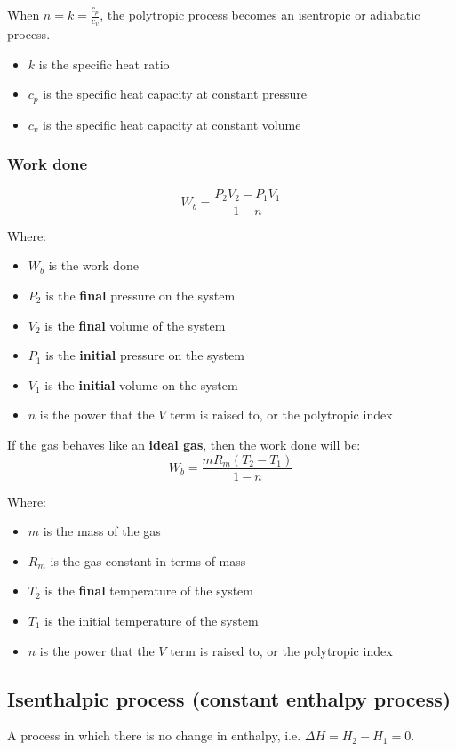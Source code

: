\documentclass[11pt]{article}
\begin{document}
When \(n = k = \frac{c_p}{c_v}\), the polytropic process becomes an isentropic or adiabatic process.
\begin{itemize}
\item \(k\) is the specific heat ratio
\item \(c_p\) is the specific heat capacity at constant pressure
\item \(c_v\) is the specific heat capacity at constant volume
\end{itemize}

\newpage

\subsubsection{Work done}
\label{sec:org0edfbde}
\[W_b = \frac{P_2 V_2 - P_1 V_1}{1 - n}\]

Where:
\begin{itemize}
\item \(W_b\) is the work done
\item \(P_2\) is the \textbf{final} pressure on the system
\item \(V_2\) is the \textbf{final} volume of the system
\item \(P_1\) is the \textbf{initial} pressure on the system
\item \(V_1\) is the \textbf{initial} volume on the system
\item \(n\) is the power that the \(V\) term is raised to, or the polytropic index
\end{itemize}

If the gas behaves like an \textbf{ideal gas}, then the work done will be:
\[W_b = \frac{m R_m (T_2 - T_1)}{1 - n}\]

Where:
\begin{itemize}
\item \(m\) is the mass of the gas
\item \(R_m\) is the gas constant in terms of mass
\item \(T_2\) is the \textbf{final} temperature of the system
\item \(T_1\) is the initial temperature of the system
\item \(n\) is the power that the \(V\) term is raised to, or the polytropic index
\end{itemize}

\subsection{Isenthalpic process (constant enthalpy process)}
\label{sec:orgaf4fb43}
A process in which there is no change in enthalpy, i.e. \(\Delta H = H_2 - H_1 = 0\).
\end{document}
